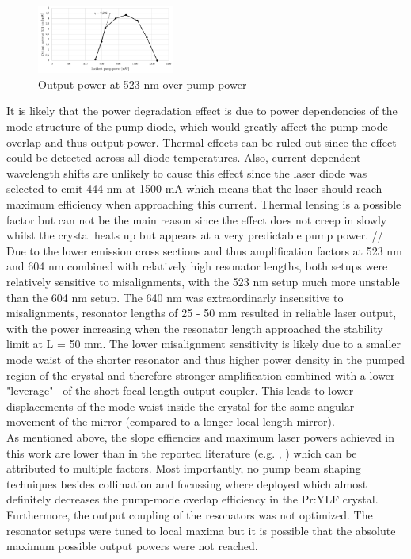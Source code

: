 \documentclass[conference]{IEEEtran}
\begin{document}
\begin{figure}[h]
	\centering
	\includegraphics[width=0.4\textwidth]{img/measurement523}
	\caption{Output power at 523 nm over pump power}
	\label{result523}
\end{figure}
It is likely that the power degradation effect is due to power dependencies of the mode structure of the pump diode, which would greatly affect the pump-mode overlap and thus output power. Thermal effects can be ruled out since the effect could be detected across all diode temperatures. Also, current dependent wavelength shifts are unlikely to cause this effect since the laser diode was selected to emit 444 nm at 1500 mA which means that the laser should reach maximum efficiency when approaching this current. Thermal lensing is a possible factor but can not be the main reason since the effect does not creep in slowly whilst the crystal heats up but appears at a very predictable pump power. //
Due to the lower emission cross sections and thus amplification factors at 523 nm and 604 nm combined with relatively high resonator lengths, both setups were relatively sensitive to misalignments, with the 523 nm setup much more unstable than the 604 nm setup. The 640 nm was extraordinarly insensitive to misalignments, resonator lengths of 25 - 50 mm resulted in reliable laser output, with the power increasing when the resonator length approached the stability limit at L = 50 mm. The lower misalignment sensitivity is likely due to a smaller mode waist of the shorter resonator and thus higher power density in the pumped region of the crystal and therefore stronger amplification combined with a lower "leverage" \ of the short focal length output coupler. This leads to lower displacements of the mode waist inside the crystal for the same angular movement of the mirror (compared to a longer local length mirror).\\
As mentioned above, the slope effiencies and maximum laser powers achieved in this work are lower than in the reported literature (e.g. \cite{Richter.2007}, \cite{Luo.2016}) which can be attributed to multiple factors. Most importantly, no pump beam shaping techniques besides collimation and focussing where deployed which almost definitely decreases the pump-mode overlap efficiency in the Pr:YLF crystal. Furthermore, the output coupling of the resonators was not optimized. The resonator setups were tuned to local maxima but it is possible that the absolute maximum possible output powers were not reached.
\end{document}
